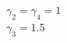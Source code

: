 \documentclass[preview]{standalone}
\begin{document}
\begin{center}
$\gamma_2 = \gamma_4 = 1$\\$\gamma_3 = 1.5$
\end{center}
\end{document}
